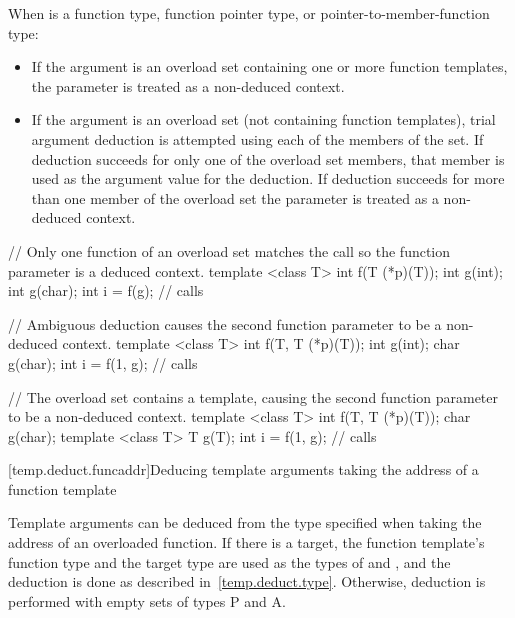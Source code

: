 \pnum
When
is a function type, function pointer type, or pointer-to-member-function type:
\begin{itemize}
\item
If the argument is an overload set containing one or more function templates,
the parameter is treated as a non-deduced context.
\item
If the argument is an overload set (not containing function templates), trial
argument deduction is attempted using each of the members of the set. If
deduction succeeds for only one of the overload set members, that member is
used as the argument value for the deduction. If deduction succeeds for more than
one member of the overload set the parameter is treated as a non-deduced context.
\end{itemize}

\pnum
\begin{example}
\begin{codeblock}
// Only one function of an overload set matches the call so the function parameter is a deduced context.
template <class T> int f(T (*p)(T));
int g(int);
int g(char);
int i = f(g);       // calls 
\end{codeblock}
\end{example}

\pnum
\begin{example}
\begin{codeblock}
// Ambiguous deduction causes the second function parameter to be a non-deduced context.
template <class T> int f(T, T (*p)(T));
int g(int);
char g(char);
int i = f(1, g);    // calls 
\end{codeblock}
\end{example}

\pnum
\begin{example}
\begin{codeblock}
// The overload set contains a template, causing the second function parameter to be a non-deduced context.
template <class T> int f(T, T (*p)(T));
char g(char);
template <class T> T g(T);
int i = f(1, g);    // calls 
\end{codeblock}
\end{example}

[temp.deduct.funcaddr]{Deducing template arguments taking the address of a function template}

\pnum
Template arguments can be deduced from the type specified when taking
the address of an overloaded function.
If there is a target,
the function template's function type and the target type
are used as the types of
and
,
and the deduction is done as
described in~\ref{temp.deduct.type}.
Otherwise, deduction is performed with empty sets of types P and A.


